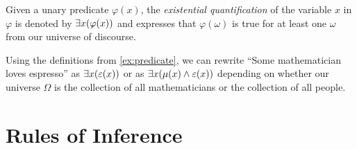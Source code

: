 \begin{definition}
    Given a unary predicate $\varphi(x)$,
    the \emph{existential quantification} of the variable $x$ in $\varphi$
    is denoted by $\exists x \pn*{\varphi(x)}$
    and expresses that $\varphi(\omega)$ is true for at least one $\omega$ from our universe of discourse.
\end{definition}
\begin{example}
    Using the definitions from \autoref{ex:predicate},
    we can rewrite ``Some mathematician loves espresso'' as
    $\exists x \pn*{\varepsilon(x)}$ or as $\exists x \pn*{\mu(x) \meet \varepsilon(x)}$
    depending on whether our universe $\Omega$
    is the collection of all mathematicians or the collection of all people.
\end{example}

\newpage

\section{Rules of Inference}

